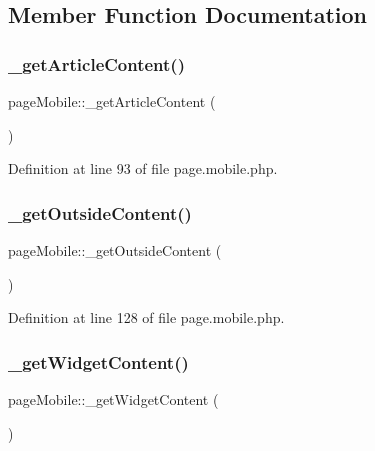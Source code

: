 \subsection{Member Function Documentation}
\hypertarget{classpageMobile_a1db84b18401fa8f49a453908b65e3cb0}{}\label{classpageMobile_a1db84b18401fa8f49a453908b65e3cb0} 
\subsubsection{\texorpdfstring{\+\_\+get\+Article\+Content()}{\_getArticleContent()}}
{\footnotesize\ttfamily page\+Mobile\+::\+\_\+get\+Article\+Content (\begin{DoxyParamCaption}{ }\end{DoxyParamCaption})}



Definition at line 93 of file page.\+mobile.\+php.

\hypertarget{classpageMobile_ac66b4cd03a329d1d64823f623d8e6fd2}{}\label{classpageMobile_ac66b4cd03a329d1d64823f623d8e6fd2} 
\subsubsection{\texorpdfstring{\+\_\+get\+Outside\+Content()}{\_getOutsideContent()}}
{\footnotesize\ttfamily page\+Mobile\+::\+\_\+get\+Outside\+Content (\begin{DoxyParamCaption}{ }\end{DoxyParamCaption})}



Definition at line 128 of file page.\+mobile.\+php.

\hypertarget{classpageMobile_a5e65e98a19965434e96d015d758a6e04}{}\label{classpageMobile_a5e65e98a19965434e96d015d758a6e04} 
\subsubsection{\texorpdfstring{\+\_\+get\+Widget\+Content()}{\_getWidgetContent()}}
{\footnotesize\ttfamily page\+Mobile\+::\+\_\+get\+Widget\+Content (\begin{DoxyParamCaption}{ }\end{DoxyParamCaption})}



